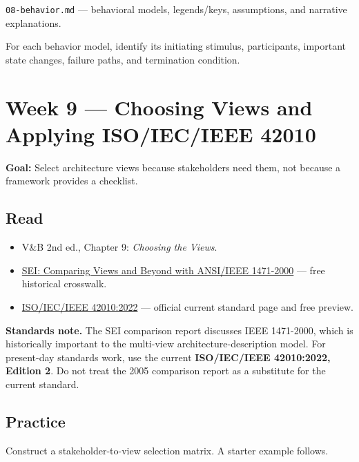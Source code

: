 \documentclass[10pt,letterpaper]{article}
\begin{document}
\begin{deliverablebox}
\texttt{08-behavior.md} --- behavioral models, legends/keys, assumptions, and narrative explanations.
\end{deliverablebox}

\begin{masterybox}
For each behavior model, identify its initiating stimulus, participants, important state changes, failure paths, and termination condition.
\end{masterybox}

\section{Week 9 --- Choosing Views and Applying ISO/IEC/IEEE 42010}

\textbf{Goal:} Select architecture views because stakeholders need them, not because a framework provides a checklist.

\subsection{Read}
\begin{itemize}
  \item V\&B 2nd ed., Chapter 9: \emph{Choosing the Views}.
  \item \href{https://www.sei.cmu.edu/library/comparing-the-seis-views-and-beyond-approach-for-documenting-software-architectures-with-ansi-ieee-1471-2000/}{SEI: Comparing Views and Beyond with ANSI/IEEE 1471-2000} --- free historical crosswalk.
  \item \href{https://www.iso.org/standard/74393.html}{ISO/IEC/IEEE 42010:2022} --- official current standard page and free preview.
\end{itemize}

\begin{keybox}
\textbf{Standards note.} The SEI comparison report discusses IEEE 1471-2000, which is historically important to the multi-view architecture-description model. For present-day standards work, use the current \textbf{ISO/IEC/IEEE 42010:2022, Edition 2}. Do not treat the 2005 comparison report as a substitute for the current standard.
\end{keybox}

\subsection{Practice}
Construct a stakeholder-to-view selection matrix. A starter example follows.
\end{document}
